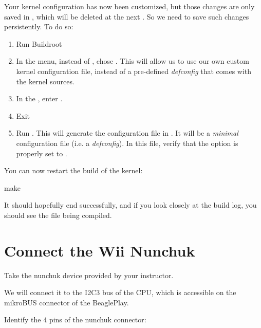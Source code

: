 Your kernel configuration has now been customized, but those changes
are only saved in , which
will be deleted at the next . So we need to save such
changes persistently. To do so:

\begin{enumerate}

\item Run Buildroot 

\item In the  menu, instead of ,
  chose . This will allow us to use
  our own custom kernel configuration file, instead of a pre-defined
  {\em defconfig} that comes with the kernel sources.

\item In the , enter
  .

\item Exit 

\item Run . This will generate
  the configuration file in
  . It will be a {\em
    minimal} configuration file (i.e. a {\em defconfig}). In this
  file, verify that the option  is
  properly set to .

\end{enumerate}

You can now restart the build of the kernel:

\begin{bashinput}
make
\end{bashinput}

It should hopefully end successfully, and if you look closely at the
build log, you should see the file  being compiled.

\section{Connect the Wii Nunchuk}

Take the nunchuk device provided by your instructor.

We will connect it to the I2C3 bus of the CPU, which is accessible on
the mikroBUS connector of the BeaglePlay.

Identify the 4 pins of the nunchuk connector:

